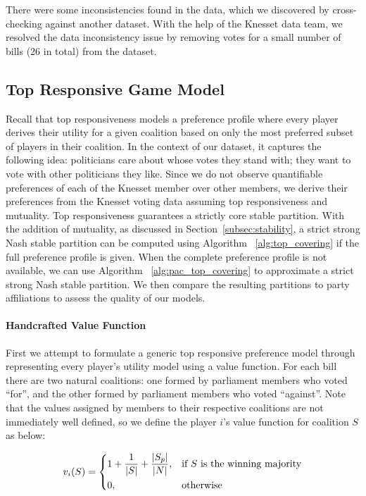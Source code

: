 \documentclass[letterpaper]{article} %
\theoremstyle{definition}
\begin{document}
There were some inconsistencies found in the data, which we discovered by cross-checking against another dataset. With the help of the Knesset data team, we resolved the data inconsistency issue by removing votes for a small number of bills (26 in total) from the dataset.

\subsection{Top Responsive Game Model} \label{subsec:exp_pac_models}
Recall that top responsiveness models a preference profile where every player derives their utility for a given coalition based on only the most preferred subset of players in their coalition. In the context of our dataset, it captures the following idea: politicians care about whose votes they stand with; they want to vote with other politicians they like. Since we do not observe quantifiable preferences of each of the Knesset member over other members, we derive their preferences from the Knesset voting data assuming top responsiveness and mutuality. Top responsiveness guarantees a strictly core stable partition. With the addition of mutuality, as discussed in Section~\ref{subsec:stability}, a strict strong Nash stable partition can be computed using Algorithm ~\ref{alg:top_covering} if the full preference profile is given. When the complete preference profile is not available, we can use Algorithm ~\ref{alg:pac_top_covering} to approximate a strict strong Nash stable partition. We then compare the resulting partitions to party affiliations to assess the quality of our models.

\paragraph{Handcrafted Value Function}
First we attempt to formulate a generic top responsive preference model through representing every player's utility model using a value function. 
For each bill there are two natural coalitions: one formed by parliament members who voted ``for'', and the other formed by parliament members who voted ``against''. Note that the values assigned by members to their respective coalitions are not immediately well defined, so we define the player $i$'s value function for coalition $S$ as below:

\[
  v_i(S) = 
  \begin{dcases}
      1 + \frac{1}{|S|} + \frac{|S_p|}{|N|},& \text{if $S$ is the winning majority}\\
      0,              & \text{otherwise}
  \end{dcases}
\]
\end{document}
